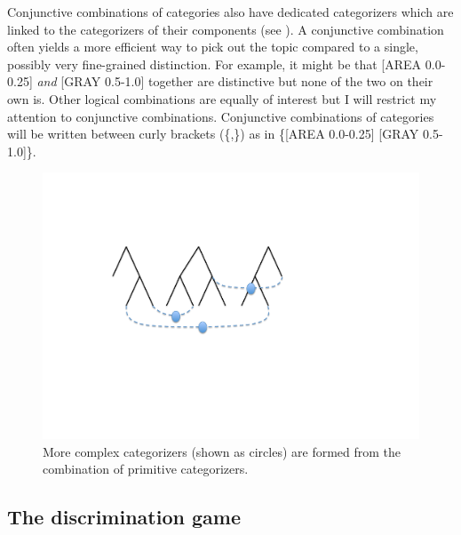 Conjunctive combinations of categories also have
dedicated categorizers which are linked to 
the categorizers of their components (see 
). A conjunctive combination 
often yields a more efficient way to pick out 
the topic compared to a single, possibly very fine-grained
distinction. For example, it might be that 
[AREA 0.0-0.25] {\it and} [GRAY 0.5-1.0]
together are distinctive but none of the two on their
own is. Other logical combinations are equally of interest
but I will restrict my attention to conjunctive 
combinations. Conjunctive combinations of categories 
will be written between curly brackets (\{,\}) as in 
\{[AREA 0.0-0.25] [GRAY 0.5-1.0]\}. 
\begin{figure}[htbp]
  \centerline{\includegraphics[width=.65\textwidth]{chap4/figs/disnet}}
\caption{\label{disnet} More complex categorizers
(shown as circles) are formed from the combination
of primitive categorizers.}
\end{figure}

\subsection{The discrimination game} 

